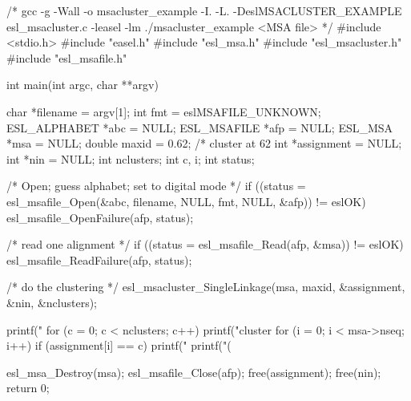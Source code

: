 \begin{cchunk}
/*
   gcc -g -Wall -o msacluster_example -I. -L. -DeslMSACLUSTER_EXAMPLE esl_msacluster.c -leasel -lm
   ./msacluster_example <MSA file>
 */
#include <stdio.h>
#include "easel.h"
#include "esl_msa.h"
#include "esl_msacluster.h"
#include "esl_msafile.h"

int
main(int argc, char **argv)
{
  char        *filename   = argv[1];
  int          fmt        = eslMSAFILE_UNKNOWN; 
  ESL_ALPHABET *abc       = NULL;
  ESL_MSAFILE  *afp       = NULL;
  ESL_MSA      *msa       = NULL;
  double       maxid      = 0.62; /* cluster at 62%
  int         *assignment = NULL;
  int         *nin        = NULL;
  int          nclusters;
  int          c, i;		  
  int          status;

  /* Open; guess alphabet; set to digital mode */
  if ((status = esl_msafile_Open(&abc, filename, NULL, fmt, NULL, &afp)) != eslOK)
    esl_msafile_OpenFailure(afp, status);

  /* read one alignment */
  if ((status = esl_msafile_Read(afp, &msa)) != eslOK)
    esl_msafile_ReadFailure(afp, status);

  /* do the clustering */
  esl_msacluster_SingleLinkage(msa, maxid, &assignment, &nin, &nclusters);

  printf("%
  for (c = 0; c < nclusters; c++) {
    printf("cluster %
    for (i = 0; i < msa->nseq; i++) if (assignment[i] == c) printf("  %
    printf("(%
  }

  esl_msa_Destroy(msa);
  esl_msafile_Close(afp);
  free(assignment);
  free(nin);
  return 0;
}
\end{cchunk}
